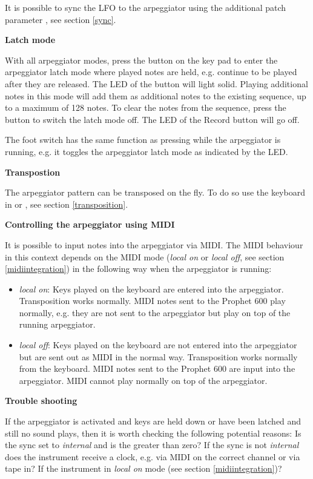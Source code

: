 It is possible to sync the LFO to the arpeggiator using the additional patch parameter \clocksync, see section \ref{sync}.

\textbf{Latch mode}

With all arpeggiator modes, press the \record button on the key pad to enter the arpeggiator latch mode where played notes are held, e.g. continue to be played after they are released. The LED of the \record button will light solid. Playing additional notes in this mode will add them as additional notes to the existing sequence, up to a maximum of 128 notes. To clear the notes from the sequence, press the \record button to switch the latch mode off. The LED of the Record button will go off.

The foot switch has the same function as pressing \record while the arpeggiator is running, e.g. it toggles the arpeggiator latch mode as indicated by the \record LED. 

\textbf{Transpostion}

The arpeggiator pattern can be transposed on the fly. To do so use the keyboard in \shiftmode or \shiftlock, see section \ref{transposition}.

\textbf{Controlling the arpeggiator using MIDI}

It is possible to input notes into the arpeggiator via MIDI. The MIDI behaviour in this context depends on the MIDI mode (\textit{local on} or \textit{local off}, see section \ref{midiintegration}) in the following way when the arpeggiator is running:

\begin{itemize}
  \item \textit{local on}: Keys played on the keyboard are entered into the arpeggiator. Transposition works normally. MIDI notes sent to the Prophet 600 play normally, e.g. they are not sent to the arpeggiator but play  on top of the running arpeggiator.
  \item \textit{local off}: Keys played on the keyboard are not entered into the arpeggiator but are sent out as MIDI in the normal way. Transposition works normally from the keyboard. MIDI notes sent to the Prophet 600 are input into the arpeggiator. MIDI cannot play normally on top of the arpeggiator. 
\end{itemize}

\textbf{Trouble shooting}

If the arpeggiator is activated and keys are held down or have been latched and still no sound plays, then it is worth checking the following potential reasons: Is the sync set to \textit{internal} and is the \clock greater than zero? If the sync is not \textit{internal} does the instrument receive a clock, e.g. via MIDI on the correct channel or via tape in? If the instrument in \textit{local on} mode (see section \ref{midiintegration})?
